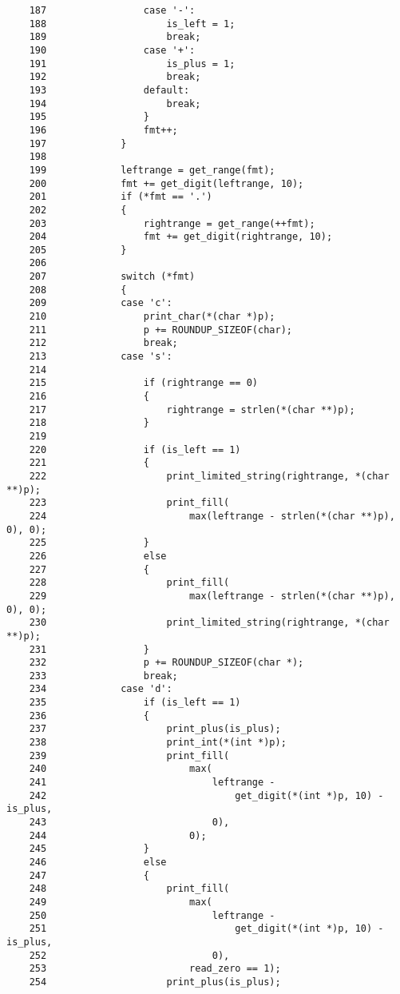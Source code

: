 \documentclass[a4j,11pt]{jarticle}
\begin{document}
\begin{verbatim}
    187	                case '-':
    188	                    is_left = 1;
    189	                    break;
    190	                case '+':
    191	                    is_plus = 1;
    192	                    break;
    193	                default:
    194	                    break;
    195	                }
    196	                fmt++;
    197	            }
    198	
    199	            leftrange = get_range(fmt);
    200	            fmt += get_digit(leftrange, 10);
    201	            if (*fmt == '.')
    202	            {
    203	                rightrange = get_range(++fmt);
    204	                fmt += get_digit(rightrange, 10);
    205	            }
    206	
    207	            switch (*fmt)
    208	            {
    209	            case 'c':
    210	                print_char(*(char *)p);
    211	                p += ROUNDUP_SIZEOF(char);
    212	                break;
    213	            case 's':
    214	
    215	                if (rightrange == 0)
    216	                {
    217	                    rightrange = strlen(*(char **)p);
    218	                }
    219	
    220	                if (is_left == 1)
    221	                {
    222	                    print_limited_string(rightrange, *(char **)p);
    223	                    print_fill(
    224	                        max(leftrange - strlen(*(char **)p), 0), 0);
    225	                }
    226	                else
    227	                {
    228	                    print_fill(
    229	                        max(leftrange - strlen(*(char **)p), 0), 0);
    230	                    print_limited_string(rightrange, *(char **)p);
    231	                }
    232	                p += ROUNDUP_SIZEOF(char *);
    233	                break;
    234	            case 'd':
    235	                if (is_left == 1)
    236	                {
    237	                    print_plus(is_plus);
    238	                    print_int(*(int *)p);
    239	                    print_fill(
    240	                        max(
    241	                            leftrange -
    242	                                get_digit(*(int *)p, 10) - is_plus,
    243	                            0),
    244	                        0);
    245	                }
    246	                else
    247	                {
    248	                    print_fill(
    249	                        max(
    250	                            leftrange -
    251	                                get_digit(*(int *)p, 10) - is_plus,
    252	                            0),
    253	                        read_zero == 1);
    254	                    print_plus(is_plus);

\end{verbatim}
\end{document}
